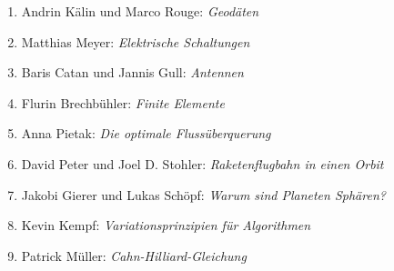 \documentclass[handout]{beamer}
\begin{document}
\begin{frame}
\begin{columns}[t,onlytextwidth]
\begin{column}{0.65\textwidth}
\begin{description}
\begin{enumerate}
\item Andrin Kälin und Marco Rouge: {\em Geodäten}
\item Matthias Meyer: {\em Elektrische Schaltungen}
\item Baris Catan und Jannis Gull: {\em Antennen}
\item Flurin Brechbühler: {\em Finite Elemente}
\item Anna Pietak: {\em Die optimale Flussüberquerung}
\item David Peter und Joel D. Stohler: {\em Raketenflugbahn in einen Orbit}
\item Jakobi Gierer und Lukas Schöpf: {\em Warum sind Planeten Sphären?}
\item Kevin Kempf: {\em Variationsprinzipien für Algorithmen}
\item Patrick Müller: {\em Cahn-Hilliard-Gleichung}
\end{enumerate}
\end{description}
\end{column}
\begin{column}{0.01\textwidth}
\end{column}
\end{columns}
\end{frame}
\end{document}
